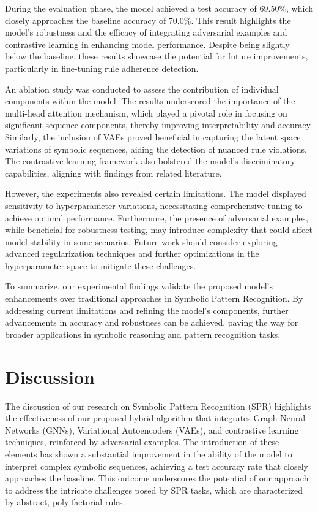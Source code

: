 \documentclass{article}
\begin{document}
During the evaluation phase, the model achieved a test accuracy of 69.50\%, which closely approaches the baseline accuracy of 70.0\%. This result highlights the model's robustness and the efficacy of integrating adversarial examples and contrastive learning in enhancing model performance. Despite being slightly below the baseline, these results showcase the potential for future improvements, particularly in fine-tuning rule adherence detection.

An ablation study was conducted to assess the contribution of individual components within the model. The results underscored the importance of the multi-head attention mechanism, which played a pivotal role in focusing on significant sequence components, thereby improving interpretability and accuracy. Similarly, the inclusion of VAEs proved beneficial in capturing the latent space variations of symbolic sequences, aiding the detection of nuanced rule violations. The contrastive learning framework also bolstered the model's discriminatory capabilities, aligning with findings from related literature.

However, the experiments also revealed certain limitations. The model displayed sensitivity to hyperparameter variations, necessitating comprehensive tuning to achieve optimal performance. Furthermore, the presence of adversarial examples, while beneficial for robustness testing, may introduce complexity that could affect model stability in some scenarios. Future work should consider exploring advanced regularization techniques and further optimizations in the hyperparameter space to mitigate these challenges.

To summarize, our experimental findings validate the proposed model's enhancements over traditional approaches in Symbolic Pattern Recognition. By addressing current limitations and refining the model's components, further advancements in accuracy and robustness can be achieved, paving the way for broader applications in symbolic reasoning and pattern recognition tasks.

\section{Discussion}
The discussion of our research on Symbolic Pattern Recognition (SPR) highlights the effectiveness of our proposed hybrid algorithm that integrates Graph Neural Networks (GNNs), Variational Autoencoders (VAEs), and contrastive learning techniques, reinforced by adversarial examples. The introduction of these elements has shown a substantial improvement in the ability of the model to interpret complex symbolic sequences, achieving a test accuracy rate that closely approaches the baseline. This outcome underscores the potential of our approach to address the intricate challenges posed by SPR tasks, which are characterized by abstract, poly-factorial rules.
\end{document}
